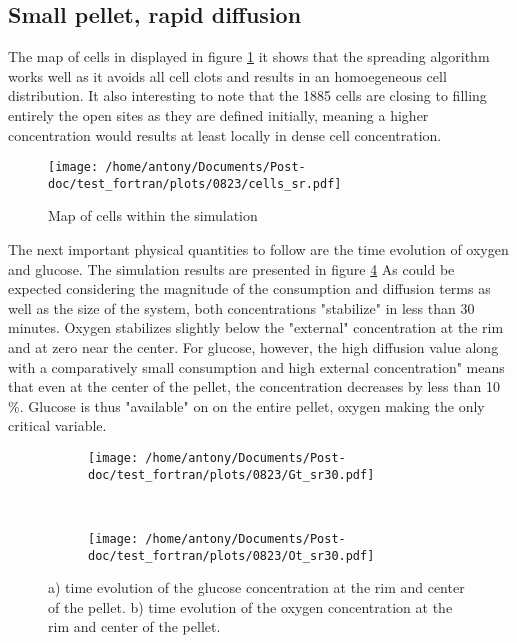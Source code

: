 \documentclass[11pt,a4paper]{article}
\begin{document}
\subsection{Small pellet, rapid diffusion}
The map of cells in displayed in figure \ref{cells_sr} it shows that the spreading algorithm works well as it avoids all cell clots and results in an homoegeneous cell distribution. It also interesting to note that the 1885 cells are closing to filling entirely the open sites as they are defined initially, meaning a higher concentration would results at least locally in dense cell concentration. 

\begin{figure}[ht!]
\begin{center}
\texttt{[image: /home/antony/Documents/Post-doc/test\_fortran/plots/0823/cells\_sr.pdf]}
\caption{Map of cells within the simulation \label{cells_sr}}
\end{center}
\end{figure}

The next important physical quantities to follow are the time evolution of oxygen and glucose. The simulation results are presented in figure \ref{GOt_sr30} As could be expected considering the magnitude of the consumption and diffusion terms as well as the size of the system, both concentrations "stabilize" in less than 30 minutes. Oxygen stabilizes slightly below the "external" concentration at the rim and at zero near the center. For glucose, however, the high diffusion value along with a comparatively small consumption and high external concentration" means that even at the center of the pellet, the concentration decreases by less than 10 \%. Glucose is thus "available" on on the entire pellet, oxygen making the only critical variable.

\begin{figure}[ht!]
	\begin{subfigure}{0.45\textwidth}
	\centering
	\texttt{[image: /home/antony/Documents/Post-doc/test\_fortran/plots/0823/Gt\_sr30.pdf]}
	\caption{ \label{Gt_sr30}}
	\end{subfigure}
	~~
	\begin{subfigure}{0.45\textwidth}
	\texttt{[image: /home/antony/Documents/Post-doc/test\_fortran/plots/0823/Ot\_sr30.pdf]}
		\caption{ \label{Ot_sr30}}
	\end{subfigure}
	\caption{a) time evolution of the glucose concentration at the rim and center of the pellet. b) time evolution of the oxygen concentration at the rim and center of the pellet.\label{GOt_sr30}}
	\end{figure}
	
\end{document}
